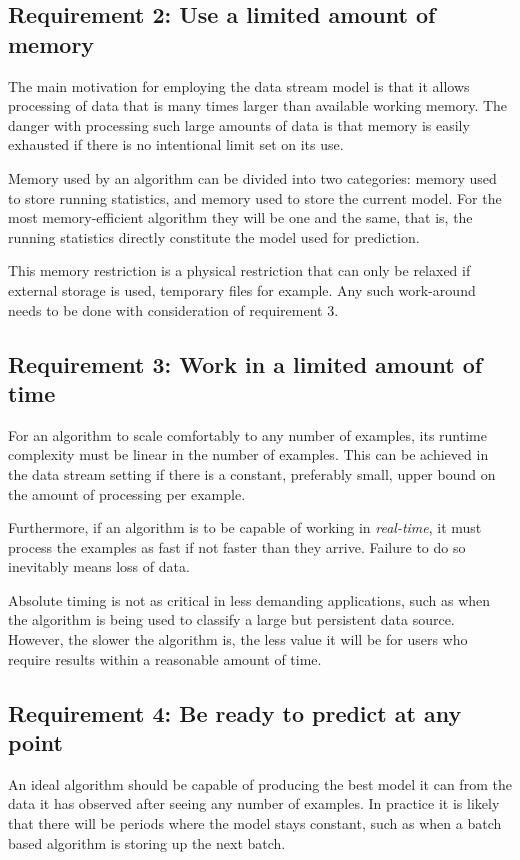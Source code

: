 \subsection*{Requirement 2: Use a limited amount of memory}

The main motivation for employing the data stream model is that it allows processing of data that is many times larger than available working memory. The danger with processing such large amounts of data is that memory is easily exhausted if there is no intentional limit set on its use.

Memory used by an algorithm can be divided into two categories: memory used to store running statistics, and memory used to store the current model. For the most memory-efficient algorithm they will be one and the same, that is, the running statistics directly constitute the model used for prediction.

This memory restriction is a physical restriction that can only be relaxed if external storage is used, temporary files for example. Any such work-around needs to be done with consideration of requirement 3.

\subsection*{Requirement 3: Work in a limited amount of time}

For an algorithm to scale comfortably to any number of examples, its runtime complexity must be linear in the number of examples. This can be achieved in the data stream setting if there is a constant, preferably small, upper bound on the amount of processing per example.

Furthermore, if an algorithm is to be capable of working in \emph{real-time}, it must process the examples as fast if not faster than they arrive. Failure to do so inevitably means loss of data.

Absolute timing is not as critical in less demanding applications, such as when the algorithm is being used to classify a large but persistent data source. However, the slower the algorithm is, the less value it will be for users who require results within a reasonable amount of time.

\subsection*{Requirement 4: Be ready to predict at any point}

An ideal algorithm should be capable of producing the best model it can from the data it has observed after seeing any number of examples. In practice it is likely that there will be periods where the model stays constant, such as when a batch based algorithm is storing up the next batch.

